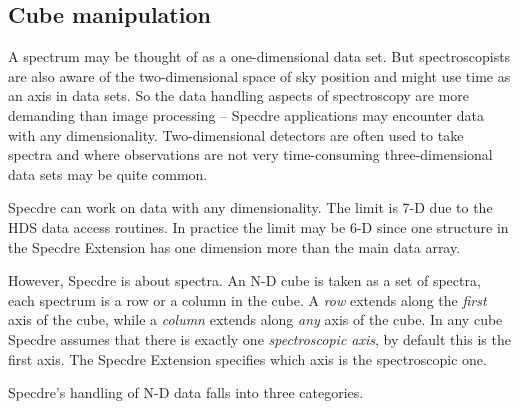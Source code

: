 \documentclass[11pt,twoside]{article}
\newcommand{\xlabel}[1]{}
\begin{document}

\subsection{\label{specdrecubeman}\xlabel{specdrecubeman}Cube manipulation}

   A spectrum may be thought of as a one-dimensional data set.  But
   spectroscopists are also aware of the two-dimensional space of sky
   position and might use time as an axis in data sets.  So the data
   handling aspects of spectroscopy are more demanding than image
   processing -- Specdre applications may encounter data with any
   dimensionality.  Two-dimensional detectors are often used to take
   spectra and where observations are not very time-consuming
   three-dimensional data sets may be quite common.

   Specdre can work on data with any dimensionality.  The limit is 7-D
   due to the HDS data access routines.  In practice the limit may be
   6-D since one structure in the Specdre Extension has one dimension
   more than the main data array.

   However, Specdre is about spectra.  An N-D cube is taken as a set of
   spectra, each spectrum is a row or a column in the cube.  A {\it row}
   extends along the {\it first} axis of the cube, while a {\it column}
   extends along {\it any} axis of the cube.  In any cube Specdre
   assumes that there is exactly one {\it spectroscopic axis}, by
   default this is the first axis.  The Specdre Extension specifies
   which axis is the spectroscopic one.

   Specdre's handling of N-D data falls into three categories.
\end{document}
